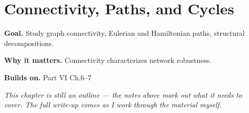 \chapter{Connectivity, Paths, and Cycles}
\label{ch:06-combinatorics-and-graph-theory-08}

\begin{chapterintro}
\textbf{Goal.} Study graph connectivity, Eulerian and Hamiltonian paths, structural decompositions.

\textbf{Why it matters.} Connectivity characterizes network robustness.

\textbf{Builds on.} Part VI Ch.6–7
\end{chapterintro}

\textit{This chapter is still an outline --- the notes above mark out what it needs to cover. The full write-up comes as I work through the material myself.}

